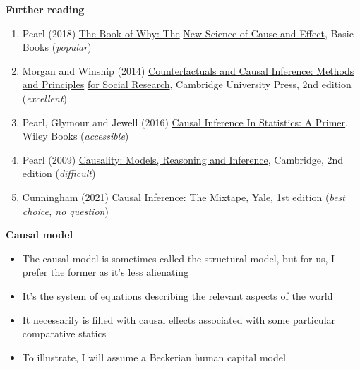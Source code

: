 \documentclass[notes=show]{beamer}
\begin{document}
\begin{frame}[plain]

\begin{center}
\textbf{Further reading}
\end{center}

\begin{enumerate}

\item Pearl (2018) \underline{The Book of Why: The} \underline{New Science of Cause and Effect}, Basic Books (\emph{popular})
\item Morgan and Winship (2014) \underline{Counterfactuals and Causal Inference: Methods and Principles} \underline{for Social Research}, Cambridge University Press, 2nd edition (\emph{excellent})
\item Pearl, Glymour and Jewell (2016) \underline{Causal Inference In Statistics: A Primer}, Wiley Books (\emph{accessible})
\item Pearl (2009) \underline{Causality: Models, Reasoning and Inference}, Cambridge, 2nd edition (\emph{difficult})
\item Cunningham (2021) \underline{Causal Inference: The Mixtape}, Yale, 1st edition (\emph{best choice, no question})
\end{enumerate}

\end{frame}


\begin{frame}[plain]

\begin{center}
\textbf{Causal model}
\end{center}

\begin{itemize}
\item The causal model is sometimes called the structural model, but for us, I prefer the former as it's less alienating 
\item It's the system of equations describing the relevant aspects of the world
\item It necessarily is filled with causal effects associated with some particular comparative statics
\item To illustrate, I will assume a Beckerian human capital model 
\end{itemize}

\end{frame}
\end{document}
